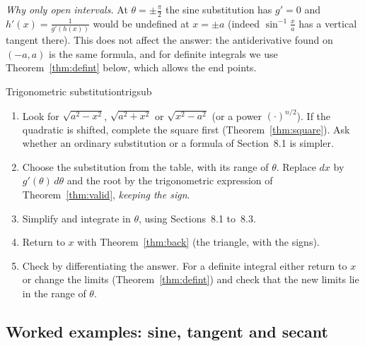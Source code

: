 \documentclass[11pt]{article}
\begin{document}
\emph{Why only open intervals.} At $\theta=\pm\frac\pi2$ the sine substitution has $g'=0$ and $h'(x)=\frac1{g'(h(x))}$ would be undefined at $x=\pm a$ (indeed $\sin^{-1}\frac xa$ has a vertical tangent there). This does not affect the answer: the antiderivative found on $(-a,a)$ is the same formula, and for definite integrals we use Theorem~\ref{thm:defint} below, which allows the end points.

\begin{proc}{Trigonometric substitution}{trigsub}
\begin{enumerate}[nosep]
  \item Look for $\sqrt{a^2-x^2}$, $\sqrt{a^2+x^2}$ or $\sqrt{x^2-a^2}$ (or a power $(\cdot)^{n/2}$). If the quadratic is shifted, complete the square first (Theorem~\ref{thm:square}). Ask whether an ordinary substitution or a formula of Section~8.1 is simpler.
  \item Choose the substitution from the table, with its range of $\theta$. Replace $dx$ by $g'(\theta)\,d\theta$ and the root by the trigonometric expression of Theorem~\ref{thm:valid}, \emph{keeping the sign}.
  \item Simplify and integrate in $\theta$, using Sections~8.1 to~8.3.
  \item Return to $x$ with Theorem~\ref{thm:back} (the triangle, with the signs).
  \item Check by differentiating the answer. For a definite integral either return to $x$ or change the limits (Theorem~\ref{thm:defint}) and check that the new limits lie in the range of $\theta$.
\end{enumerate}
\end{proc}

\subsection*{Worked examples: sine, tangent and secant}
\end{document}
